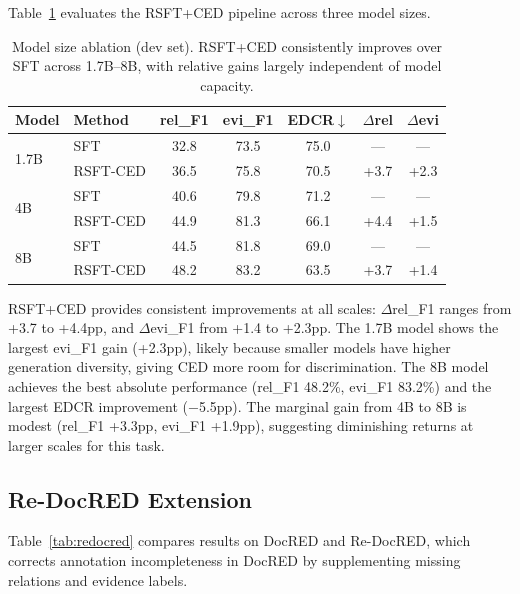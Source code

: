 \documentclass[11pt,a4paper]{article}
\begin{document}
Table~\ref{tab:size} evaluates the RSFT+CED pipeline across three model sizes.

\begin{table}[t]
\centering
\small
\begin{tabular}{llccccc}
\toprule
\textbf{Model} & \textbf{Method} & \textbf{rel\_F1} & \textbf{evi\_F1} & \textbf{EDCR}$\downarrow$ & $\Delta$\textbf{rel} & $\Delta$\textbf{evi} \\
\midrule
\multirow{2}{*}{1.7B} & SFT & 32.8 & 73.5 & 75.0 & --- & --- \\
 & RSFT-CED & 36.5 & 75.8 & 70.5 & +3.7 & +2.3 \\
\midrule
\multirow{2}{*}{4B} & SFT & 40.6 & 79.8 & 71.2 & --- & --- \\
 & RSFT-CED & 44.9 & 81.3 & 66.1 & +4.4 & +1.5 \\
\midrule
\multirow{2}{*}{8B} & SFT & 44.5 & 81.8 & 69.0 & --- & --- \\
 & RSFT-CED & 48.2 & 83.2 & 63.5 & +3.7 & +1.4 \\
\bottomrule
\end{tabular}
\caption{Model size ablation (dev set). RSFT+CED consistently improves over SFT across 1.7B--8B, with relative gains largely independent of model capacity.}
\label{tab:size}
\end{table}

RSFT+CED provides consistent improvements at all scales: $\Delta$rel\_F1 ranges from +3.7 to +4.4pp, and $\Delta$evi\_F1 from +1.4 to +2.3pp. The 1.7B model shows the largest evi\_F1 gain (+2.3pp), likely because smaller models have higher generation diversity, giving CED more room for discrimination. The 8B model achieves the best absolute performance (rel\_F1 48.2\%, evi\_F1 83.2\%) and the largest EDCR improvement ($-$5.5pp). The marginal gain from 4B to 8B is modest (rel\_F1 +3.3pp, evi\_F1 +1.9pp), suggesting diminishing returns at larger scales for this task.

\subsection{Re-DocRED Extension}
\label{sec:redocred}

Table~\ref{tab:redocred} compares results on DocRED and Re-DocRED, which corrects annotation incompleteness in DocRED by supplementing missing relations and evidence labels.
\end{document}
